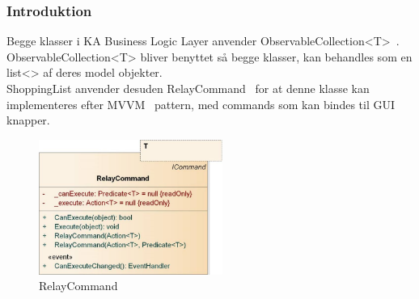 \subsubsection{Introduktion}

Begge klasser i \gls{KA} Business Logic Layer anvender ObservableCollection<T>~\cite{ObsCol}. ObservableCollection<T> bliver benyttet så begge klasser, kan behandles som en list<> af deres model objekter.\\
ShoppingList anvender desuden RelayCommand~\cite{RelayC} for at denne klasse kan implementeres efter MVVM~\cite{MVVM} pattern, med commands som kan bindes til \gls{GUI} knapper. 

\begin{figure}[H]
	\centering
	\includegraphics[width=60mm]{Systemdesign/Frontend/BLL/Pics/Relay}
	\caption{RelayCommand}
	\label{fig:RelayCmdKasse}
\end{figure}